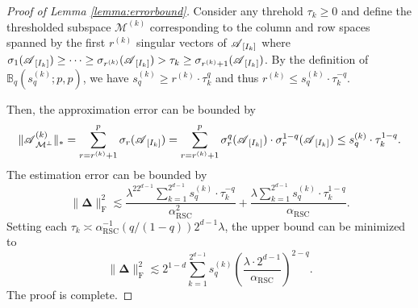 \documentclass[12pt]{article}
\newcommand{\bm}{\boldsymbol}
\newcommand{\cm}[1]{\mbox{\boldmath$\mathscr{#1}$}}
\begin{document}
\begin{proof}[Proof of Lemma \ref{lemma:errorbound}]
	Consider any threhold $\tau_k\geq0$ and define the thresholded subspace $\mathcal{M}^{(k)}$ corresponding to the column and row spaces spanned by the first $r^{(k)}$ singular vectors of $\cm{A}_{[I_k]}$ where $\sigma_1(\cm{A}_{[I_k]})\geq\cdots\geq\sigma_{r^{(k)}}(\cm{A}_{[I_k]})> \tau_k\geq\sigma_{r^{(k)}+1}(\cm{A}_{[I_k]})$.
	By the definition of $\mathbb{B}_q(s_q^{(k)};p,p)$, we have $s_q^{(k)}\geq r^{(k)}\cdot\tau_k^q$ and thus $r^{(k)}\leq s_q^{(k)}\cdot\tau_k^{-q}$.
	
	Then, the approximation error can be bounded by
	\begin{equation}
		\|\cm{A}^{(k)}_{\mathcal{M}^\perp}\|_{*}=\sum_{r=r^{(k)}+1}^{p}\sigma_r(\cm{A}_{[I_k]})=\sum_{r=r^{(k)}+1}^{p}\sigma_r^q(\cm{A}_{[I_k]})\cdot\sigma_r^{1-q}(\cm{A}_{[I_k]})\leq s_q^{(k)}\cdot\tau_k^{1-q}.
	\end{equation}
	The estimation error can be bounded by
	\begin{equation}
		\|\bm{\Delta}\|_\text{F}^2\lesssim\frac{\lambda^22^{d-1}\sum_{k=1}^{2^{d-1}}s_q^{(k)}\cdot\tau_k^{-q}}{\alpha_{\text{RSC}}^2}+\frac{\lambda\sum_{k=1}^{2^{d-1}} s_q^{(k)}\cdot\tau_k^{1-q}}{\alpha_{\text{RSC}}}.
	\end{equation}
	Setting each $\tau_k\asymp\alpha_\text{RSC}^{-1}(q/(1-q))2^{d-1}\lambda$, the upper bound can be minimized to
	\begin{equation}
		\|\bm{\Delta}\|_\text{F}^2\lesssim 2^{1-d}\sum_{k=1}^{2^{d-1}}s_q^{(k)}\left(\frac{\lambda\cdot 2^{d-1}}{\alpha_{\text{RSC}}}\right)^{2-q}.
	\end{equation}
	The proof is complete.	
\end{proof}
\end{document}

